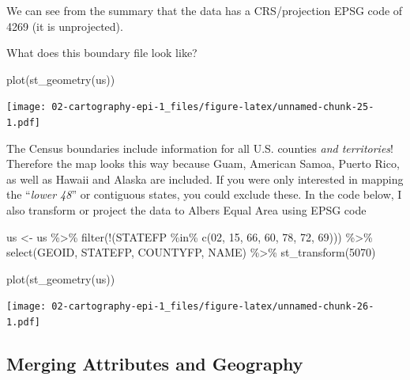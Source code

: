 \documentclass[
]{book}
\newenvironment{Shaded}{\begin{snugshade}}{\end{snugshade}}
\newcommand{\DecValTok}[1]{\textcolor[rgb]{0.00,0.00,0.81}{#1}}
\newcommand{\FunctionTok}[1]{\textcolor[rgb]{0.00,0.00,0.00}{#1}}
\newcommand{\NormalTok}[1]{#1}
\newcommand{\OtherTok}[1]{\textcolor[rgb]{0.56,0.35,0.01}{#1}}
\newcommand{\SpecialCharTok}[1]{\textcolor[rgb]{0.00,0.00,0.00}{#1}}
\newcommand{\StringTok}[1]{\textcolor[rgb]{0.31,0.60,0.02}{#1}}
\begin{document}
We can see from the summary that the data has a CRS/projection EPSG code of 4269 (it is unprojected).

What does this boundary file look like?

\begin{Shaded}
\begin{Highlighting}[]
\FunctionTok{plot}\NormalTok{(}\FunctionTok{st\_geometry}\NormalTok{(us))}
\end{Highlighting}
\end{Shaded}

\texttt{[image: 02-cartography-epi-1\_files/figure-latex/unnamed-chunk-25-1.pdf]}

The Census boundaries include information for all U.S. counties \emph{and territories}! Therefore the map looks this way because Guam, American Samoa, Puerto Rico, as well as Hawaii and Alaska are included. If you were only interested in mapping the ``\emph{lower 48}'' or contiguous states, you could exclude these. In the code below, I also transform or project the data to Albers Equal Area using EPSG code

\begin{Shaded}
\begin{Highlighting}[]
\NormalTok{us }\OtherTok{\textless{}{-}}\NormalTok{ us }\SpecialCharTok{\%\textgreater{}\%}
  \FunctionTok{filter}\NormalTok{(}\SpecialCharTok{!}\NormalTok{(STATEFP }\SpecialCharTok{\%in\%} \FunctionTok{c}\NormalTok{(}\StringTok{\textquotesingle{}02\textquotesingle{}}\NormalTok{, }\StringTok{\textquotesingle{}15\textquotesingle{}}\NormalTok{, }\StringTok{\textquotesingle{}66\textquotesingle{}}\NormalTok{, }\StringTok{\textquotesingle{}60\textquotesingle{}}\NormalTok{, }\StringTok{\textquotesingle{}78\textquotesingle{}}\NormalTok{, }\StringTok{\textquotesingle{}72\textquotesingle{}}\NormalTok{, }\StringTok{\textquotesingle{}69\textquotesingle{}}\NormalTok{))) }\SpecialCharTok{\%\textgreater{}\%}
  \FunctionTok{select}\NormalTok{(GEOID, STATEFP, COUNTYFP, NAME) }\SpecialCharTok{\%\textgreater{}\%}
  \FunctionTok{st\_transform}\NormalTok{(}\DecValTok{5070}\NormalTok{)}

\FunctionTok{plot}\NormalTok{(}\FunctionTok{st\_geometry}\NormalTok{(us))}
\end{Highlighting}
\end{Shaded}

\texttt{[image: 02-cartography-epi-1\_files/figure-latex/unnamed-chunk-26-1.pdf]}

\hypertarget{merging-attributes-and-geography}{%
\subsection{Merging Attributes and Geography}\label{merging-attributes-and-geography}}
\end{document}
